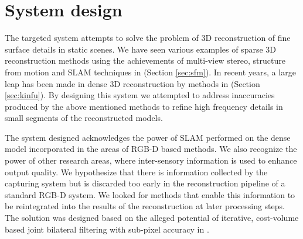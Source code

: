 \documentclass{ucl_thesis}
\newcommand{\secref}[1]{(Section \ref{#1})}
\begin{document}
%					
%					
%		
%		
%	

\chapter{System design} 
\label{chp:my_system}

\par The targeted system attempts to solve the problem of 3D reconstruction of fine surface details in static scenes. We have seen various examples of sparse 3D reconstruction methods using the achievements of multi-view stereo, structure from motion and SLAM techniques in \secref{sec:sfm}. In recent years, a large leap has been made in dense 3D reconstruction by methods in \secref{sec:kinfu}. By designing this system we attempted to address inaccuracies produced by the above mentioned methods to refine high frequency details in small segments of the reconstructed models. \\

\par The system designed acknowledges the power of SLAM performed on the dense model incorporated in the areas of RGB-D based methods. We also recognize the power of other research areas, where inter-sensory information is used to enhance output quality. We hypothesize that there is information collected by the capturing system but is discarded too early in the reconstruction pipeline of a standard RGB-D system. We looked for methods that enable this information to be reintegrated into the results of the reconstruction at later processing steps. The solution was designed based on the alleged potential of iterative, cost-volume based joint bilateral filtering with sub-pixel accuracy in \citep{cvpr-07-qingxiong-yang}. \\
\end{document}
